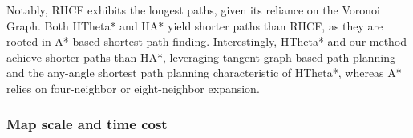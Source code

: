 \documentclass[lettersize,journal]{IEEEtran}
\begin{document}
Notably, RHCF exhibits the longest paths, given its reliance on the Voronoi Graph. Both HTheta* and HA* yield shorter paths than RHCF, as they are rooted in A*-based shortest path finding. Interestingly, HTheta* and our method achieve shorter paths than HA*, leveraging tangent graph-based path planning and the any-angle shortest path planning characteristic of HTheta*, whereas A* relies on four-neighbor or eight-neighbor expansion.
     
\subsubsection{Map scale and time cost}










\end{document}

